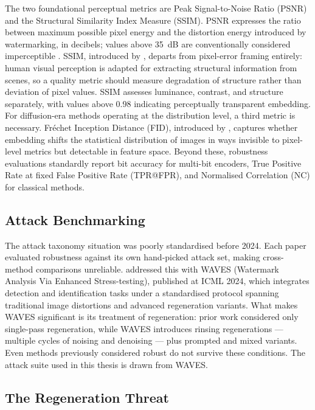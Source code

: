﻿\documentclass[12pt, a4paper, twoside]{report}
\numberwithin{equation}{chapter}
\begin{document}
The two foundational perceptual metrics are Peak Signal-to-Noise Ratio (PSNR) and the Structural Similarity Index Measure (SSIM). PSNR expresses the ratio between maximum possible pixel energy and the distortion energy introduced by watermarking, in decibels; values above 35~dB are conventionally considered imperceptible \cite{huynhthu2008}. SSIM, introduced by \cite{wang2004}, departs from pixel-error framing entirely: human visual perception is adapted for extracting structural information from scenes, so a quality metric should measure degradation of structure rather than deviation of pixel values. SSIM assesses luminance, contrast, and structure separately, with values above 0.98 indicating perceptually transparent embedding. For diffusion-era methods operating at the distribution level, a third metric is necessary. Fr\'{e}chet Inception Distance (FID), introduced by \cite{heusel2017}, captures whether embedding shifts the statistical distribution of images in ways invisible to pixel-level metrics but detectable in feature space. Beyond these, robustness evaluations standardly report bit accuracy for multi-bit encoders, True Positive Rate at fixed False Positive Rate (TPR@FPR), and Normalised Correlation (NC) for classical methods.

\subsection*{Attack Benchmarking}

The attack taxonomy situation was poorly standardised before 2024. Each paper evaluated robustness against its own hand-picked attack set, making cross-method comparisons unreliable. \cite{an2024} addressed this with WAVES (Watermark Analysis Via Enhanced Stress-testing), published at ICML 2024, which integrates detection and identification tasks under a standardised protocol spanning traditional image distortions and advanced regeneration variants. What makes WAVES significant is its treatment of regeneration: prior work considered only single-pass regeneration, while WAVES introduces rinsing regenerations --- multiple cycles of noising and denoising --- plus prompted and mixed variants. Even methods previously considered robust do not survive these conditions. The attack suite used in this thesis is drawn from WAVES.

\subsection*{The Regeneration Threat}
\end{document}
